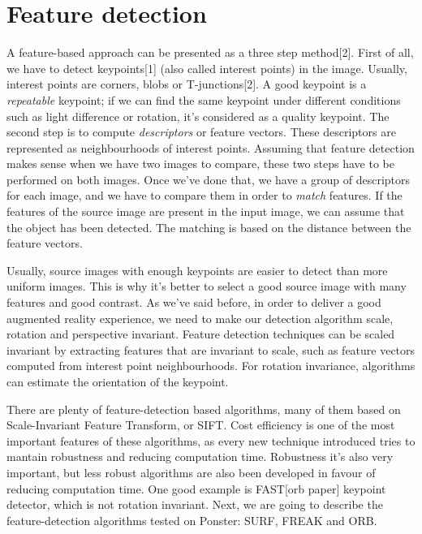 \section{Feature detection}

A feature-based approach can be presented as a three step method[2]. First of all, we
have to detect keypoints[1] (also called interest points) in the image. Usually,
interest points are corners, blobs or T-junctions[2]. A good keypoint is a
\emph{repeatable} keypoint; if we can find the same keypoint under different
conditions such as light difference or rotation, it's considered as a quality
keypoint. The second step is to compute \emph{descriptors} or feature
vectors. These descriptors are represented as neighbourhoods of interest
points. Assuming that feature
detection makes sense when we have two images to compare, these two steps have to be
performed on both images. Once we've done that, we have a group of descriptors for
each image, and we have to compare them in order to \emph{match} features. If the
features of the source image are present in the input image, we can assume that the
object has been detected. The matching is based on the distance between the feature
vectors. 

Usually, source images with enough keypoints are easier to detect than more
uniform images. This is why it's better to select a good source image with many
features and good contrast. 
As we've said before, in order to deliver a good augmented reality experience,
we need to make our detection algorithm scale, rotation and perspective
invariant. Feature detection techniques can be scaled invariant by extracting
features that are invariant to scale, such as feature vectors computed from
interest point neighbourhoods. For rotation invariance, algorithms can
estimate the orientation of the keypoint. %

There are plenty of feature-detection based algorithms, many of them based on
Scale-Invariant Feature Transform, or SIFT. Cost efficiency is one of the most
important features of these algorithms, as every new technique introduced tries to
mantain robustness and reducing computation time. Robustness it's also very
important, but less robust algorithms are also been developed in favour of reducing
computation time. One good example is FAST[orb paper] keypoint detector, which is
not rotation invariant. %
Next, we are going to describe the feature-detection algorithms tested on Ponster:
SURF, FREAK and ORB.

